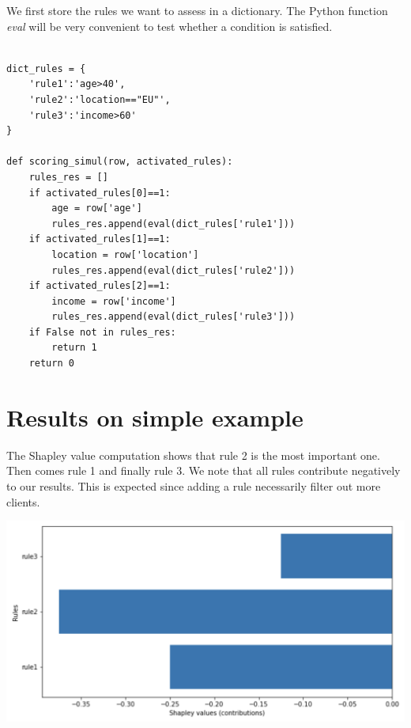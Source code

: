 We first store the rules we want to assess in a dictionary. The Python function \textit{eval} will be very convenient to test whether a condition is satisfied.

\lstset{language=Python}
\lstset{frame=lines}
\lstset{basicstyle=\footnotesize}
\begin{lstlisting}

dict_rules = {
    'rule1':'age>40',
    'rule2':'location=="EU"',
    'rule3':'income>60'
}

def scoring_simul(row, activated_rules):
    rules_res = []
    if activated_rules[0]==1:
        age = row['age']
        rules_res.append(eval(dict_rules['rule1']))
    if activated_rules[1]==1:
        location = row['location']
        rules_res.append(eval(dict_rules['rule2']))
    if activated_rules[2]==1:
        income = row['income']
        rules_res.append(eval(dict_rules['rule3']))
    if False not in rules_res:
        return 1
    return 0

\end{lstlisting}

\section{Results on simple example}

\label{sec:results-simple-example}

The Shapley value computation shows that rule 2 is the most important one. Then comes rule 1 and finally rule 3. We note that all rules contribute negatively to our results. This is expected since adding a rule necessarily filter out more clients.

\begin{center}
\includegraphics[scale=0.6]{shapley-results.png}
\end{center}

